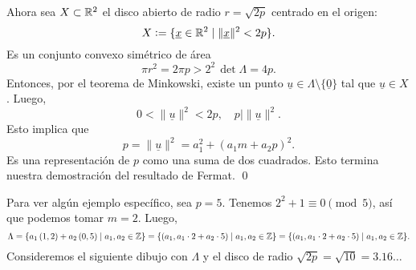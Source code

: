 \documentclass{article}
\numberwithin{equation}{section}
\begin{document}
Ahora sea $X \subset \mathbb{R}^2$ el disco abierto de radio $r = \sqrt{2p}$ centrado
en el origen:
$$X \mathrel{\mathop:}= \{ \underline{x} \in \mathbb{R}^2 \mid \|\underline{x}\|^2 < 2p \}.$$
Es un conjunto convexo simétrico de área
$$\pi r^2 = 2\pi p > 2^2\,\det \Lambda = 4 p.$$
Entonces, por el teorema de Minkowski, existe un punto
$\underline{u} \in \Lambda \setminus \{ \underline{0} \}$ tal que
$\underline{u} \in X$. Luego,
$$0 < \|\underline{u}\|^2 < 2p, \quad p \mid \|\underline{u}\|^2.$$
Esto implica que
$$p = \|\underline{u}\|^2 = a_1^2 + (a_1 m + a_2 p)^2.$$
Es una representación de $p$ como una suma de dos cuadrados. Esto termina
nuestra demostración del resultado de Fermat. \qed

\vspace{1em}

Para ver algún ejemplo específico, sea $p = 5$. Tenemos
$2^2 + 1 \equiv 0 \pmod{5}$, así que podemos tomar $m = 2$. Luego,
\[ \Lambda = \{ a_1\,(1,2) + a_2\,(0,5) \mid a_1, a_2 \in \mathbb{Z} \} =
   \{ (a_1, a_1\cdot 2 + a_2 \cdot 5) \mid a_1, a_2 \in \mathbb{Z} \} =
   \{ (a_1, a_1\cdot 2 + a_2 \cdot 5) \mid a_1, a_2 \in \mathbb{Z} \}. \]
Consideremos el siguiente dibujo con $\Lambda$ y el disco de radio
$\sqrt{2p} = \sqrt{10} = 3.16\ldots$
\end{document}
